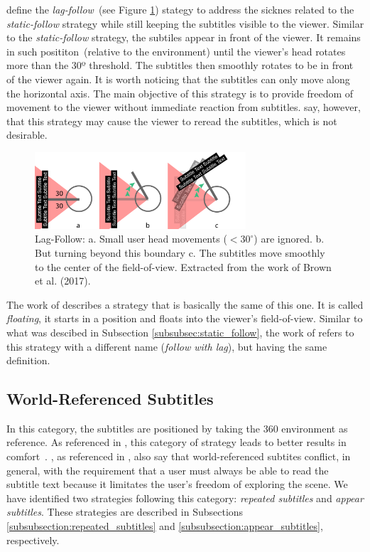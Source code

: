  define the \emph{lag-follow}~(see Figure \ref{fig:lag_follow}) stategy to address the sicknes related to the \emph{static-follow} strategy while still keeping the subtitles visible to the viewer. Similar to the \emph{static-follow} strategy, the subtiles appear in front of the viewer. It remains in such posititon~(relative to the environment) until the viewer's head rotates more than the 30º threshold. The subtitles then smoothly rotates to be in front of the viewer again. It is worth noticing that the subtitles can only move along the horizontal axis. The main objective of this strategy is to provide freedom of movement to the viewer without immediate reaction from subtitles.  say, however, that this strategy may cause the viewer to reread the subtitles, which is not desirable.


\begin{figure}[!ht]
    \centering
    \includegraphics[width=0.7\textwidth]{img/lag-follow.png}
    \caption{Lag-Follow: a. Small user head movements ($<30^{\circ}$) are ignored. b. But turning beyond this boundary c. The subtitles move smoothly to the center of the field-of-view. Extracted from the work of Brown et al. (2017).}
    \label{fig:lag_follow}
\end{figure}

The work of  describes a strategy that is basically the same of this one. It is called \emph{floating}, it starts in a position and floats into the viewer's field-of-view. Similar to what was descibed in Subsection \ref{subsubsec:static_follow}, the work of  refers to this strategy with a different name (\emph{follow with lag}), but having the same definition.

\subsection{World-Referenced Subtitles}
\label{subsec:world_referenced}
In this category, the subtitles are positioned by taking the 360 environment as reference. 
As referenced in \cite{hughes_disruptive_2019}, this category of strategy leads to better results in comfort~\cite{rothe2018positioning}. , as referenced in , also say that world-referenced subtites conflict, in general, with the requirement that a user must always be able to read the subtitle text because it limitates the user's freedom of exploring the scene.
We have identified two strategies following this category: \emph{repeated subtitles} and \emph{appear subtitles}. These strategies are described in Subsections \ref{subsubsection:repeated_subtitles} and \ref{subsubsection:appear_subtitles}, respectively. 

